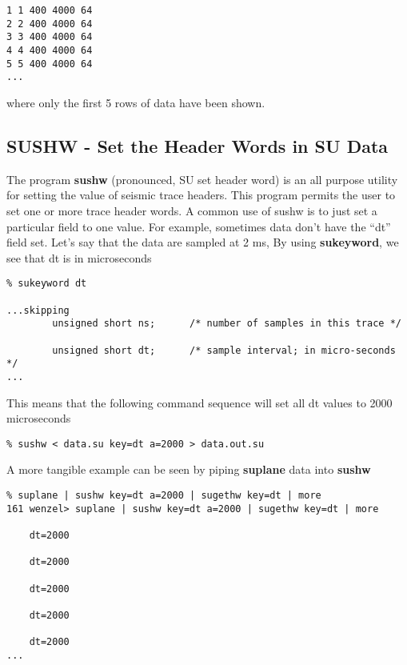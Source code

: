 {{{{\begin{verbatim}
1 1 400 4000 64
2 2 400 4000 64 
3 3 400 4000 64 
4 4 400 4000 64 
5 5 400 4000 64 
...
\end{verbatim} } \noindent
where only the first 5 rows of data have been shown.
\subsection{SUSHW - Set the Header Words in SU Data}

The program {\bf sushw\/} (pronounced, SU set header word) is
an all purpose utility for setting the value of seismic trace
headers. This program permits the user to set one or more
trace header words.
A common use of sushw is to just set a particular field to
one value. For example, sometimes data don't have the ``dt''
field set. Let's say that the data are sampled at 2 ms,
By using {\bf sukeyword}, we see that dt is in microseconds
{\small\begin{verbatim}
% sukeyword dt

...skipping
        unsigned short ns;      /* number of samples in this trace */

        unsigned short dt;      /* sample interval; in micro-seconds */
...

\end{verbatim}} \noindent
This means that the following command sequence will set all dt values
to 2000 microseconds
{\small\begin{verbatim}
% sushw < data.su key=dt a=2000 > data.out.su
\end{verbatim}} \noindent
A more tangible example can be seen by piping {\bf suplane\/} data into
{\bf sushw\/}
{\small\begin{verbatim}
% suplane | sushw key=dt a=2000 | sugethw key=dt | more
161 wenzel> suplane | sushw key=dt a=2000 | sugethw key=dt | more

    dt=2000     

    dt=2000     

    dt=2000     

    dt=2000     

    dt=2000     
...
\end{verbatim}} \noindent

}}}
